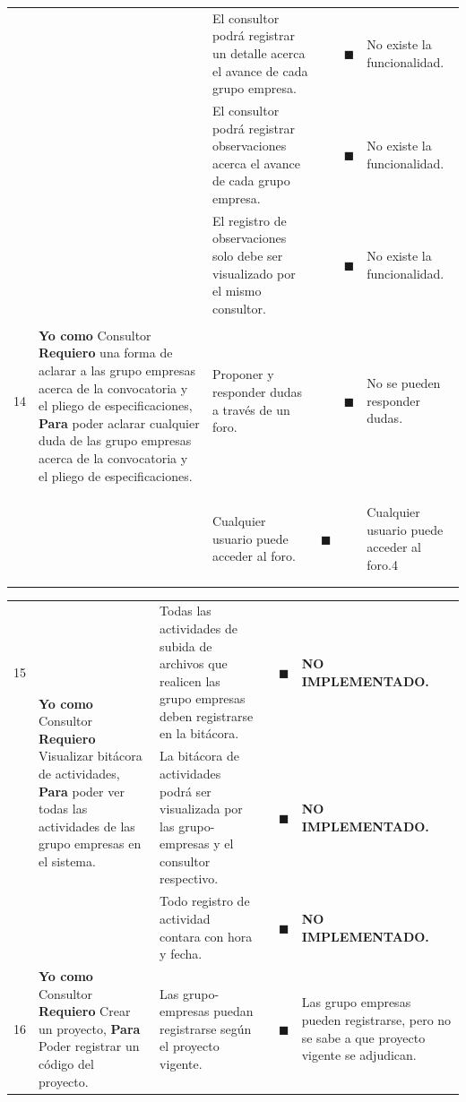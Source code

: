\documentclass[letterpaper,11pt]{article}
\begin{document}
\begin{landscape}
\begin{tabular}{|c|p{5cm}|p{7.5cm}|c|c|p{7.5cm}|}
			& & El consultor podrá registrar un detalle acerca el avance de cada grupo empresa. & & $\blacksquare$ & No existe la funcionalidad. \\ \cline{3-6} 
			& & El consultor podrá registrar observaciones acerca el avance de cada grupo empresa. & & $\blacksquare$ & No existe la funcionalidad. \\ \cline{3-6} 
			& & El registro de observaciones solo debe ser visualizado por el mismo consultor. &  & $\blacksquare$ & No existe la funcionalidad.\\ 
			&&&&& \\ \hline
			14 & \multirow{2}{5cm}{\textbf{Yo como} Consultor \textbf{Requiero} una forma de aclarar a las grupo empresas acerca de la convocatoria y el pliego de especificaciones, \textbf{Para} poder aclarar cualquier duda de las grupo empresas acerca de la convocatoria y el pliego de especificaciones.} & Proponer y responder dudas a través de un foro. & & $\blacksquare$ & No se pueden responder dudas. \\ 
			&&&&& \\
			&&&&& \\ \cline{3-6}
			&&&&& \\
			&&&&& \\
			& & Cualquier usuario puede acceder al foro. & $\blacksquare$ & & Cualquier usuario puede acceder al foro.4\\ 
			&&&&& \\
			&&&&&\\ \hline
		\end{tabular}
		\newpage
		\begin{tabular}{|c|p{5cm}|p{7.5cm}|c|c|p{7.5cm}|}
			\hline
			15 & \multirow{3}{5cm}{\textbf{Yo como} Consultor \textbf{Requiero} Visualizar bitácora de actividades, \textbf{Para} poder ver todas las actividades de las grupo empresas en el sistema.} & Todas las actividades de subida de archivos que realicen las grupo empresas deben registrarse en la bitácora. &  & $\blacksquare$ & \textbf{NO IMPLEMENTADO.} \\ \cline{3-6}
			& & La bitácora de actividades podrá ser visualizada por las grupo-empresas y el consultor respectivo. &  & $\blacksquare$ & \textbf{NO IMPLEMENTADO.} \\ \cline{3-6}
			& & Todo registro de actividad contara con hora y fecha. & & $\blacksquare$ & \textbf{NO IMPLEMENTADO.} \\ \hline
			16 & \multirow{3}{5cm}{\textbf{Yo como} Consultor \textbf{Requiero} Crear un proyecto, \textbf{Para} Poder registrar un código del proyecto.} & Las grupo-empresas puedan registrarse según el proyecto vigente. & & $\blacksquare$ & Las grupo empresas pueden registrarse, pero no se sabe a que proyecto vigente se adjudican. \\ \cline{3-6}

\end{tabular}
\end{landscape}
\end{document}
